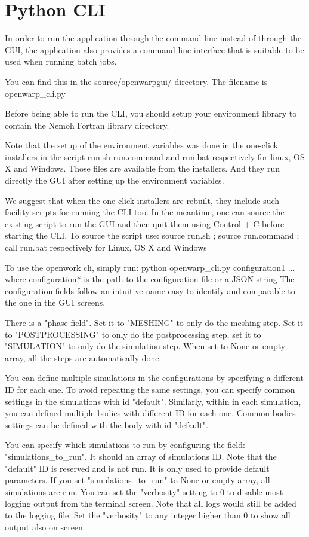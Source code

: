 \documentclass[12pt]{article}
\begin{document}
\section{Python CLI}
In order to run the application through the command line instead of through the GUI, the application also provides a command line interface that is suitable to be used when running batch jobs.

You can find this in the source/openwarpgui/ directory. The filename is openwarp_cli.py

Before being able to run the CLI, you should setup your environment library to contain the Nemoh Fortran library directory.

Note that the setup of the environment variables was done in the one-click installers in the script run.sh run.command and run.bat respectively for linux, OS X and Windows. Those files are available from the installers. And they run directly the GUI after setting up the environment variables.

We suggest that when the one-click installers are rebuilt, they include such facility scripts for running the CLI too. In the meantime, one can source the existing script to run the GUI and then quit them using Control + C before starting the CLI. To source the script use:
source run.sh ; source run.command ; call run.bat respectively for Linux, OS X and Windows

To use the openwork cli, simply run: python openwarp_cli.py configuration1 ... where configuration* is the path to the configuration file or a JSON string The configuration fields follow an intuitive name easy to identify and comparable to the one in the GUI screens.

There is a "phase field". Set it to "MESHING" to only do the meshing step.
Set it to "POSTPROCESSING" to only do the postprocessing step, set it to "SIMULATION" to only do the simulation step. When set to None or empty array, all the steps are automatically done.

You can define multiple simulations in the configurations by specifying a different ID for each one. To avoid repeating the same settings, you can specify common settings in the simulations with id "default". Similarly, within in each simulation, you can defined multiple bodies with different ID for each one. Common bodies settings can be defined with the body with id "default".

You can specify which simulations to run by configuring the field: "simulations_to_run". It should an array of simulations ID. Note that the "default" ID is reserved and is not run. It is only used to provide default parameters. If you set "simulations_to_run" to None or empty array, all
simulations are run. You can set the "verbosity" setting to 0 to disable most logging output from the terminal screen. Note that all logs would still be added to the logging file. Set the "verbosity" to any integer higher than 0 to show all output also on screen.
\end{document}
